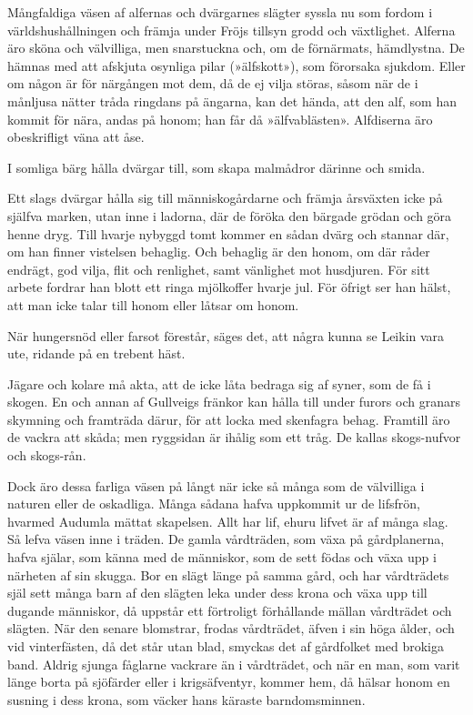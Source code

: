 Mångfaldiga väsen af alfernas och dvärgarnes slägter syssla nu som
fordom i världshushållningen och främja under Fröjs tillsyn grodd och
växtlighet. Alferna äro sköna och välvilliga, men snarstuckna och, om de
förnärmats, hämdlystna. De hämnas med att afskjuta osynliga pilar
(»älfskott»), som förorsaka sjukdom. Eller om någon är för närgången mot
dem, då de ej vilja störas, såsom när de i månljusa nätter tråda
ringdans på ängarna, kan det hända, att den alf, som han kommit för
nära, andas på honom; han får då »älfvablästen». Alfdiserna äro
obeskrifligt väna att åse.

I somliga bärg hålla dvärgar till, som skapa malmådror därinne och
smida.

Ett slags dvärgar hålla sig till människogårdarne och främja årsväxten
icke på själfva marken, utan inne i ladorna, där de föröka den bärgade
grödan och göra henne dryg. Till hvarje nybyggd tomt kommer en sådan
dvärg och stannar där, om han finner vistelsen behaglig. Och behaglig är
den honom, om där råder endrägt, god vilja, flit och renlighet, samt
vänlighet mot husdjuren. För sitt arbete fordrar han blott ett ringa
mjölkoffer hvarje jul. För öfrigt ser han hälst, att man icke talar till
honom eller låtsar om honom.

När hungersnöd eller farsot förestår, säges det, att några kunna se
Leikin vara ute, ridande på en trebent häst.

Jägare och kolare må akta, att de icke låta bedraga sig af syner, som de
få i skogen. En och annan af Gullveigs fränkor kan hålla till under
furors och granars skymning och
framträda därur, för att locka med skenfagra behag. Framtill äro de
vackra att skåda; men ryggsidan är ihålig som ett tråg. De kallas
skogs-nufvor och skogs-rån.

Dock äro dessa farliga väsen på långt när icke så många som de
välvilliga i naturen eller de oskadliga. Många sådana hafva uppkommit ur
de lifsfrön, hvarmed Audumla mättat skapelsen. Allt har lif, ehuru
lifvet är af många slag. Så lefva väsen inne i träden. De gamla
vårdträden, som växa på gårdplanerna, hafva själar, som känna med de
människor, som de sett födas och växa upp i närheten af sin skugga. Bor
en slägt länge på samma gård, och har vårdträdets själ sett många barn
af den slägten leka under dess krona och växa upp till dugande
människor, då uppstår ett förtroligt förhållande mällan vårdträdet och
slägten. När den senare blomstrar, frodas vårdträdet, äfven i sin höga
ålder, och vid vinterfästen, då det står utan blad, smyckas det af
gårdfolket med brokiga band. Aldrig sjunga fåglarne vackrare än i
vårdträdet, och när en man, som varit länge borta på sjöfärder eller i
krigsäfventyr, kommer hem, då hälsar honom en susning i dess krona, som
väcker hans käraste barndomsminnen.

